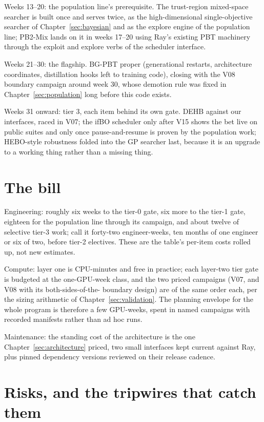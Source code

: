 Weeks 13--20: the population line's prerequisite. The trust-region
mixed-space searcher is built once and serves twice, as the
high-dimensional single-objective searcher of
Chapter~\ref{sec:bayesian} and as the explore engine of the
population line; PB2-Mix lands on it in weeks 17--20 using Ray's
existing PBT machinery through the exploit and explore verbs of the
scheduler interface.

Weeks 21--30: the flagship. BG-PBT proper (generational restarts,
architecture coordinates, distillation hooks left to training code),
closing with the V08 boundary campaign around week 30, whose
demotion rule was fixed in Chapter~\ref{sec:population} long before
this code exists.

Weeks 31 onward: tier 3, each item behind its own gate. DEHB against
our interfaces, raced in V07; the ifBO scheduler only after V15
shows the bet live on public suites and only once pause-and-resume
is proven by the population work; HEBO-style robustness folded into
the GP searcher last, because it is an upgrade to a working thing
rather than a missing thing.

\section{The bill}

Engineering: roughly six weeks to the tier-0 gate, six more to the
tier-1 gate, eighteen for the population line through its campaign,
and about twelve of selective tier-3 work; call it forty-two
engineer-weeks, ten months of one engineer or six of two, before
tier-2 electives. These are the table's per-item costs rolled up,
not new estimates.

Compute: layer one is CPU-minutes and free in practice; each
layer-two tier gate is budgeted at the one-GPU-week class, and the
two priced campaigns (V07, and V08 with its both-sides-of-the-
boundary design) are of the same order each, per the sizing
arithmetic of Chapter~\ref{sec:validation}. The planning envelope
for the whole program is therefore a few GPU-weeks, spent in named
campaigns with recorded manifests rather than ad hoc runs.

Maintenance: the standing cost of the architecture is the one
Chapter~\ref{sec:architecture} priced, two small interfaces kept
current against Ray, plus pinned dependency versions reviewed on
their release cadence.

\section{Risks, and the tripwires that catch them}


